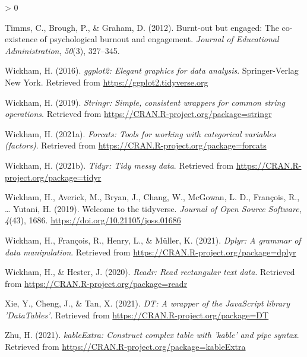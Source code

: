 \documentclass[
  english,
  man]{apa6}
\newlength{\cslhangindent}
\newenvironment{CSLReferences}[2] %
 {%
  \setlength{\parindent}{0pt}
  \ifodd #1 \everypar{\setlength{\hangindent}{\cslhangindent}}\ignorespaces\fi
  \ifnum #2 > 0
  \setlength{\parskip}{#2\baselineskip}
  \fi
 }%
 {}
\begin{document}
\begin{CSLReferences}{1}{0}
\leavevmode\hypertarget{ref-timms2012burnt}{}%
Timms, C., Brough, P., \& Graham, D. (2012). Burnt-out but engaged: The co-existence of psychological burnout and engagement. \emph{Journal of Educational Administration}, \emph{50}(3), 327--345.

\leavevmode\hypertarget{ref-R-ggplot2}{}%
Wickham, H. (2016). \emph{ggplot2: Elegant graphics for data analysis}. Springer-Verlag New York. Retrieved from \url{https://ggplot2.tidyverse.org}

\leavevmode\hypertarget{ref-R-stringr}{}%
Wickham, H. (2019). \emph{Stringr: Simple, consistent wrappers for common string operations}. Retrieved from \url{https://CRAN.R-project.org/package=stringr}

\leavevmode\hypertarget{ref-R-forcats}{}%
Wickham, H. (2021a). \emph{Forcats: Tools for working with categorical variables (factors)}. Retrieved from \url{https://CRAN.R-project.org/package=forcats}

\leavevmode\hypertarget{ref-R-tidyr}{}%
Wickham, H. (2021b). \emph{Tidyr: Tidy messy data}. Retrieved from \url{https://CRAN.R-project.org/package=tidyr}

\leavevmode\hypertarget{ref-R-tidyverse}{}%
Wickham, H., Averick, M., Bryan, J., Chang, W., McGowan, L. D., François, R., \ldots{} Yutani, H. (2019). Welcome to the {tidyverse}. \emph{Journal of Open Source Software}, \emph{4}(43), 1686. \url{https://doi.org/10.21105/joss.01686}

\leavevmode\hypertarget{ref-R-dplyr}{}%
Wickham, H., François, R., Henry, L., \& Müller, K. (2021). \emph{Dplyr: A grammar of data manipulation}. Retrieved from \url{https://CRAN.R-project.org/package=dplyr}

\leavevmode\hypertarget{ref-R-readr}{}%
Wickham, H., \& Hester, J. (2020). \emph{Readr: Read rectangular text data}. Retrieved from \url{https://CRAN.R-project.org/package=readr}

\leavevmode\hypertarget{ref-R-DT}{}%
Xie, Y., Cheng, J., \& Tan, X. (2021). \emph{DT: A wrapper of the JavaScript library 'DataTables'}. Retrieved from \url{https://CRAN.R-project.org/package=DT}

\leavevmode\hypertarget{ref-R-kableExtra}{}%
Zhu, H. (2021). \emph{kableExtra: Construct complex table with 'kable' and pipe syntax}. Retrieved from \url{https://CRAN.R-project.org/package=kableExtra}

\end{CSLReferences}

\endgroup
\end{document}
